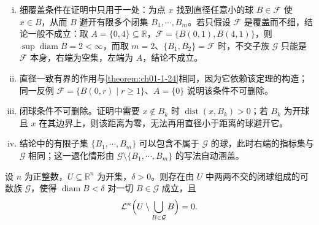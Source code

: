 \documentclass[../../main.tex]{subfiles}%
\begin{document}
\begin{remark}\label{remark:ch01-thm-1-25-条件}
\begin{enumerate}[(i)]
\item 细覆盖条件在证明中只用于一处：为点 $x$ 找到直径任意小的球 $B\in\mathcal{F}$ 使 $x\in B$，从而 $B$ 避开有限多个闭集 $B_1,\cdots,B_m$。若只假设 $\mathcal{F}$ 是覆盖而不细，结论一般不成立：取 $A=\{0,4\}\subseteq\mathbb{R}$，$\mathcal{F}=\{B(0,1),B(4,1)\}$，则 $\sup\operatorname{diam}B=2<\infty$，而取 $m=2$、$\{B_1,B_2\}=\mathcal{F}$ 时，不交子族 $\mathcal{G}$ 只能是 $\mathcal{F}$ 本身，右端为空集，左端为 $A$，结论不成立。
\item 直径一致有界的作用与\cref{theorem:ch01-1-24}相同，因为它依赖该定理的构造；同一反例 $\mathcal{F}=\{B(0,r)\mid r\geqslant1\}$、$A=\{0\}$ 说明该条件不可删除。%
\item 闭球条件不可删除。证明中需要 $x\notin B_k$ 时 $\operatorname{dist}(x,B_k)>0$；若 $B_k$ 为开球且 $x$ 在其边界上，则该距离为零，无法再用直径小于距离的球避开它。
\item 结论中的有限子集 $\{B_1,\cdots,B_m\}$ 可以包含不属于 $\mathcal{G}$ 的球，此时右端的指标集与 $\mathcal{G}$ 相同；这一退化情形由 $\mathcal{G}\setminus\{B_1,\cdots,B_m\}$ 的写法自动涵盖。
\end{enumerate}
\end{remark}

\begin{theorem}[用球填充开集]\label{theorem:ch01-1-26}
设 $n$ 为正整数，$U\subseteq\mathbb{R}^n$ 为开集，$\delta>0$。则存在由 $U$ 中两两不交的闭球组成的可数族 $\mathcal{G}$，使得 $\operatorname{diam}B<\delta$ 对一切 $B\in\mathcal{G}$ 成立，且
\begin{align*}
\mathcal{L}^n\Bigl(U\setminus\bigcup_{B\in\mathcal{G}}B\Bigr)=0 .
\end{align*}
\end{theorem}
\end{document}

